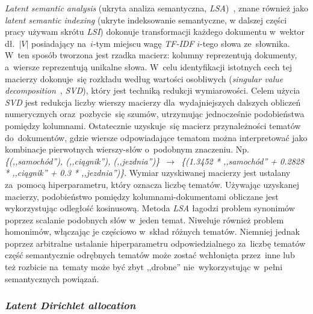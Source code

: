 \documentclass[pl]{minipw} %
\begin{document}
\textit{Latent semantic analysis} (ukryta analiza semantyczna, \textit{LSA})~\cite{lsa}, znane również jako \textit{latent semantic indexing} (ukryte indeksowanie semantyczne, w dalszej części pracy używam skrótu \textit{LSI}) dokonuje transformacji każdego dokumentu w~wektor dł.~$|V|$ posiadający na~$i$-tym miejscu wagę \textit{TF-IDF} $i$-tego słowa ze~słownika. W~ten sposób tworzona jest rzadka macierz: kolumny reprezentują dokumenty, a~wiersze reprezentują unikalne słowa. W~celu identyfikacji istotnych cech tej macierzy dokonuje~się rozkładu według wartości osobliwych (\textit{singular value decomposition}~\cite{svd}, \textit{SVD}), który jest techniką redukcji wymiarowości. Celem użycia \textit{SVD} jest redukcja liczby wierszy macierzy dla~wydajniejszych dalszych obliczeń numerycznych oraz~pozbycie~się szumów, utrzymując jednocześnie podobieństwa pomiędzy kolumnami. Ostatecznie uzyskuje~się macierz przynależności tematów do~dokumentów, gdzie wiersze odpowiadające tematom można interpretować jako kombinacje pierwotnych wierszy-słów o~podobnym znaczeniu. Np. \textit{\{(,,samochód''), (,,ciągnik''), (,,jezdnia'')\}}~$\to$~\textit{\{(1.3452 * ,,samochód'' + 0.2828 * ,,ciągnik'' + 0.3 * ,,jezdnia'')\}}. Wymiar uzyskiwanej macierzy jest ustalany za~pomocą hiperparametru, który oznacza liczbę tematów. Używając uzyskanej macierzy, podobieństwo pomiędzy kolumnami-dokumentami obliczane jest wykorzystując odległość kosinusową. Metoda \textit{LSA} łagodzi problem synonimów poprzez scalanie podobnych słów w~jeden temat. Niweluje również problem homonimów, włączając je częściowo w~skład różnych tematów. Niemniej jednak poprzez arbitralne ustalanie hiperparametru odpowiedzialnego za~liczbę tematów część semantycznie odrębnych tematów może zostać wchłonięta przez~inne lub też rozbicie na~tematy może być zbyt ,,drobne'' nie~wykorzystując w~pełni semantycznych powiązań.


\subsubsection{\textit{Latent Dirichlet allocation}}
\end{document}
